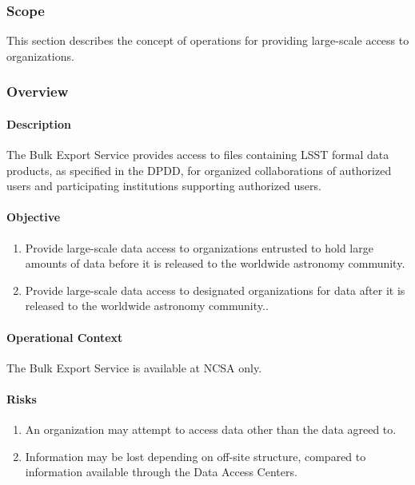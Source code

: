\subsubsection{Scope}
This section describes the concept of operations for providing large-scale access to organizations.

\subsubsection{Overview}

\paragraph{Description}

The Bulk Export Service provides access to files containing LSST formal data products, as specified in the DPDD, for organized collaborations of authorized users and
participating institutions supporting authorized users.

\paragraph{Objective}

\begin{enumerate}

\item Provide large-scale data access to organizations entrusted to hold large
amounts of data before it is released to the worldwide astronomy community.

\item Provide large-scale data access to designated organizations for data after
it is released to the worldwide astronomy community..

\end{enumerate}

\paragraph{Operational Context}
The Bulk Export Service is available at NCSA only.

\paragraph{Risks}

\begin{enumerate}

\item An organization may attempt to access data other than the data agreed to.

\item Information may be lost depending on off-site structure, compared to information available through the Data Access Centers.

\end{enumerate}


